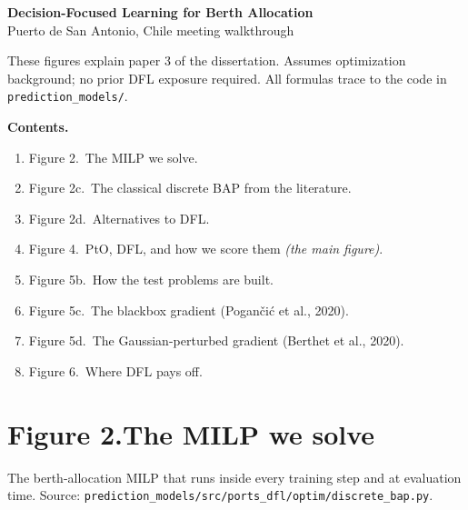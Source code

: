 \documentclass[11pt]{article}
\begin{document}
\begin{center}
{\Large\bfseries Decision-Focused Learning for Berth Allocation}\\[4pt]
{\small Puerto de San Antonio, Chile \;\textbar\;
        meeting walkthrough}
\end{center}

\vspace{0.6em}

\noindent
These figures explain paper 3 of the dissertation.  Assumes
optimization background; no prior DFL exposure required.  All formulas
trace to the code in \texttt{prediction\_models/}.

\vspace{1em}

\noindent\textbf{Contents.}
\begin{enumerate}[leftmargin=2em, itemsep=0pt]
  \item Figure 2.\ The MILP we solve.
  \item Figure 2c.\ The classical discrete BAP from the literature.
  \item Figure 2d.\ Alternatives to DFL.
  \item Figure 4.\ PtO, DFL, and how we score them \emph{(the main figure)}.
  \item Figure 5b.\ How the test problems are built.
  \item Figure 5c.\ The blackbox gradient (Pogan\v{c}i\'c et al., 2020).
  \item Figure 5d.\ The Gaussian-perturbed gradient (Berthet et al., 2020).
  \item Figure 6.\ Where DFL pays off.
\end{enumerate}

\newpage

\section*{Figure 2.\quad The MILP we solve}

\noindent
The berth-allocation MILP that runs inside every training step and at
evaluation time. Source:
\texttt{prediction\_models/src/ports\_dfl/optim/discrete\_bap.py}.
\end{document}
